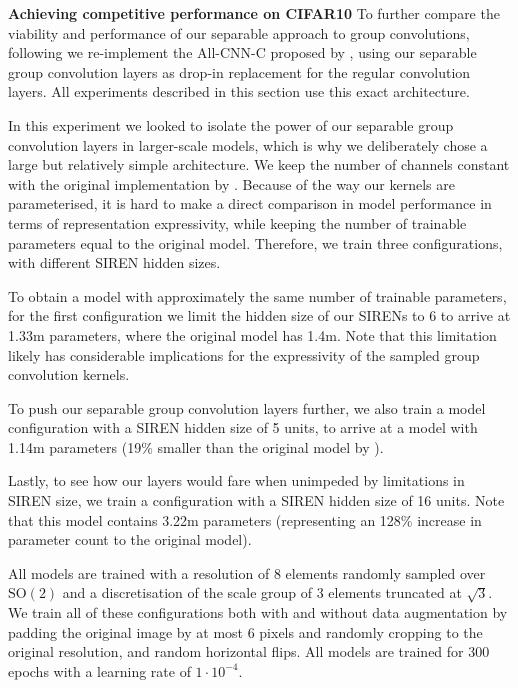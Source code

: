 \documentclass[nohyperref]{article}
\theoremstyle{plain}
\theoremstyle{definition}
\theoremstyle{remark}
\begin{document}
\textbf{Achieving competitive performance on CIFAR10} To further compare the viability and performance of our separable approach to group convolutions, following \citet{cohen2016group} we re-implement the All-CNN-C proposed by \citep{springenberg2014striving}, using our separable group convolution layers as drop-in replacement for the regular convolution layers. All experiments described in this section use this exact architecture.

In this experiment we looked to isolate the power of our separable group convolution layers in larger-scale models, which is why we deliberately chose a large but relatively simple architecture. We keep the number of channels constant with the original implementation by \citep{springenberg2014striving}. Because of the way our kernels are parameterised, it is hard to make a direct comparison in model performance in terms of representation expressivity, while keeping the number of trainable parameters equal to the original model. Therefore, we train three configurations, with different SIREN hidden sizes.

To obtain a model with approximately the same number of trainable parameters, for the first configuration we limit the hidden size of our SIRENs to 6 to arrive at 1.33m parameters, where the original model has 1.4m. Note that this limitation likely has considerable implications for the expressivity of the sampled group convolution kernels.

To push our separable group convolution layers further, we also train a model configuration with a SIREN hidden size of 5 units, to arrive at a model with 1.14m parameters (19\% smaller than the original model by \citet{springenberg2014striving}).

Lastly, to see how our layers would fare when unimpeded by limitations in SIREN size, we train a configuration with a SIREN hidden size of 16 units. Note that this model contains 3.22m parameters (representing an 128\% increase in parameter count to the original model).

All models are trained with a resolution of 8 elements randomly sampled over $\mathrm{SO(2)}$ and a discretisation of the scale group of 3 elements truncated at $\sqrt{3}$. We train all of these configurations both with and without data augmentation by padding the original image by at most 6 pixels and randomly cropping to the original resolution, and random horizontal flips. All models are trained for 300 epochs with a learning rate of $1\cdot 10^{-4}$.
\end{document}
